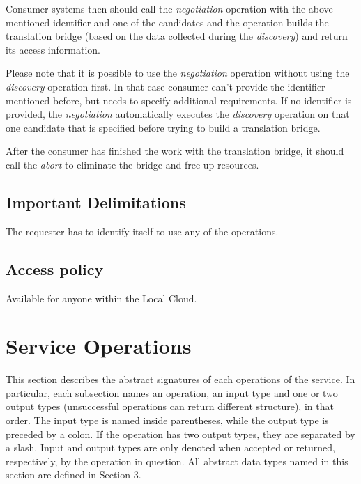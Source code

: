 \documentclass[a4paper]{arrowhead}
\begin{document}
Consumer systems then should call the \textit{negotiation} operation with the above-mentioned identifier and one of the candidates and the operation builds the translation bridge (based on the data collected during the \textit{discovery}) and return its access information.

Please note that it is possible to use the \textit{negotiation} operation without using the \textit{discovery} operation first. In that case consumer can't provide the identifier mentioned before, but needs to specify additional requirements. If no identifier is provided, the \textit{negotiation} automatically executes the \textit{discovery} operation on that one candidate that is specified before trying to build a translation bridge.

After the consumer has finished the work with the translation bridge, it should call the \textit{abort} to eliminate the bridge and free up resources.

\subsection{Important Delimitations}
\label{sec:delimitations}

The requester has to identify itself to use any of the operations.

\subsection{Access policy}
\label{sec:accesspolicy}

Available for anyone within the Local Cloud.

\newpage

\section{Service Operations}
\label{sec:functions}

This section describes the abstract signatures of each operations of the service. In particular, each subsection names an operation, an input type and one or two output types (unsuccessful operations can return different structure), in that order.
The input type is named inside parentheses, while the output type is preceded by a colon. If the operation has two output types, they are separated by a slash.
Input and output types are only denoted when accepted or returned, respectively, by the operation in question. All abstract data types named in this section are defined in Section 3.
\end{document}
